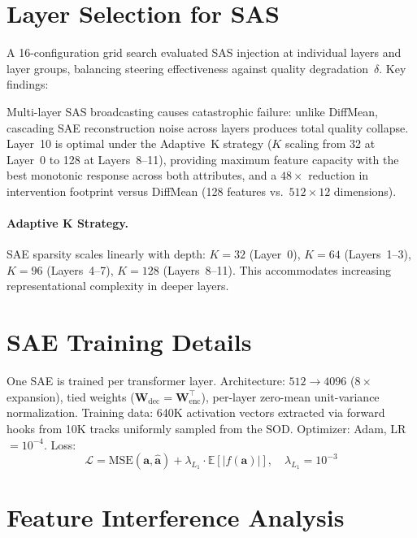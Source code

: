 \documentclass{article}
\theoremstyle{plain}
\begin{document}
\section{Layer Selection for SAS}
\label{app:layer_selection}

A 16-configuration grid search evaluated SAS injection at individual layers and layer groups, balancing steering effectiveness against quality degradation~$\delta$. Key findings:

Multi-layer SAS broadcasting causes catastrophic failure: unlike DiffMean, cascading SAE reconstruction noise across layers produces total quality collapse. Layer~10 is optimal under the Adaptive~K strategy ($K$ scaling from 32 at Layer~0 to 128 at Layers~8--11), providing maximum feature capacity with the best monotonic response across both attributes, and a $48{\times}$ reduction in intervention footprint versus DiffMean (128 features vs.\ $512{\times}12$ dimensions).

\paragraph{Adaptive K Strategy.}
SAE sparsity scales linearly with depth: $K{=}32$ (Layer~0), $K{=}64$ (Layers~1--3), $K{=}96$ (Layers~4--7), $K{=}128$ (Layers~8--11). This accommodates increasing representational complexity in deeper layers.

\section{SAE Training Details}
\label{app:sae_training}

One SAE is trained per transformer layer. Architecture: $512 \to 4096$ ($8{\times}$ expansion), tied weights ($\mathbf{W}_\text{dec} = \mathbf{W}_\text{enc}^\top$), per-layer zero-mean unit-variance normalization. Training data: 640K activation vectors extracted via forward hooks from 10K tracks uniformly sampled from the SOD. Optimizer: Adam, LR $= 10^{-4}$. Loss:
\begin{equation}
    \mathcal{L} = \text{MSE}(\mathbf{a}, \hat{\mathbf{a}}) + \lambda_{L_1} \cdot \mathbb{E}[|f(\mathbf{a})|], \quad \lambda_{L_1} = 10^{-3}
\end{equation}

\section{Feature Interference Analysis}
\label{app:interference}
\end{document}

